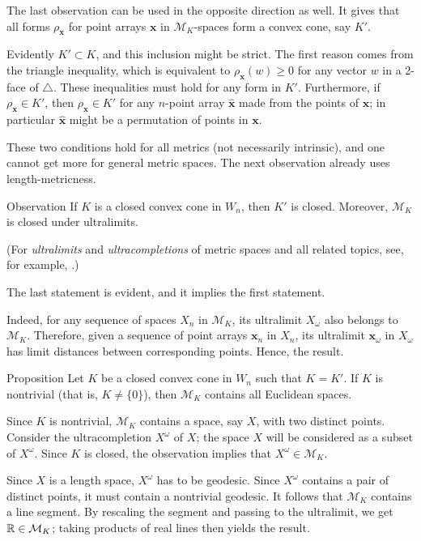 \documentclass[a4paper,10pt]{article}
\begin{document}
The last observation can be used in the opposite direction as well.
It gives that all forms $\rho_{\bm{x}}$ for point arrays $\bm{x}$ in $\mathcal{M}_K$-spaces form a convex cone, say $K'$.

Evidently $K'\subset K$, and this inclusion might be strict.
The first reason comes from the triangle inequality, which is equivalent to $\rho_{\bm{x}}(w)\ge 0$ for any vector $w$ in a 2-face of $\triangle$.
These inequalities must hold for any form in $K'$.
Furthermore, if $\rho_{\bm{x}}\in K'$, then $\rho_{\hat{\bm{x}}}\in K'$ for any $n$-point array $\hat{\bm{x}}$ made from the points of $\bm{x}$; in particular $\hat{\bm{x}}$ might be a permutation of points in $\bm{x}$.

These two conditions hold for all metrics (not necessarily intrinsic),
and one cannot get more for general metric spaces.
The next observation already uses length-metricness.

\begin{thm}{Observation}
If $K$ is a closed convex cone in $W_n$, then $K'$ is closed.
Moreover, $\mathcal{M}_K$ is closed under ultralimits.
\end{thm}

(For \emph{ultralimits} and \emph{ultracompletions} of metric spaces and all related topics, see, for example, \cite{petrunin2023}.)

The last statement is evident, and it implies the first statement.

Indeed, for any sequence of spaces $X_n$ in $\mathcal{M}_K$, its ultralimit $X_\omega$ also belongs to $\mathcal{M}_K$.
Therefore, given a sequence of point arrays $\bm{x}_n$ in $X_n$,
its ultralimit $\bm{x}_\omega$ in $X_\omega$ has limit distances between corresponding points.
Hence, the result.
\qeds

\begin{thm}{Proposition}\label{prop:Associated form}
Let $K$ be a closed convex cone in $W_n$ such that $K=K'$.
If $K$ is nontrivial (that is, $K\ne \{0\}$), then $\mathcal{M}_K$ contains all Euclidean spaces.
\end{thm}

Since $K$ is nontrivial, $\mathcal{M}_K$ contains a space, say $X$, with two distinct points.
Consider the ultracompletion $X^\omega$ of $X$;
the space $X$ will be considered as a subset of $X^\omega$.
Since $K$ is closed, the observation implies that $X^\omega\in \mathcal{M}_K$.

Since  $X$ is a length space, $X^\omega$ has to be geodesic.
Since $X^\omega$
contains a pair of distinct points, it must contain a nontrivial geodesic.
It follows that $\mathcal{M}_K$ contains a line segment.
By rescaling the segment and passing to the ultralimit, we get $\mathbb{R}\in \mathcal{M}_K$;
taking products of real lines then yields the result.
\qeds
\end{document}

